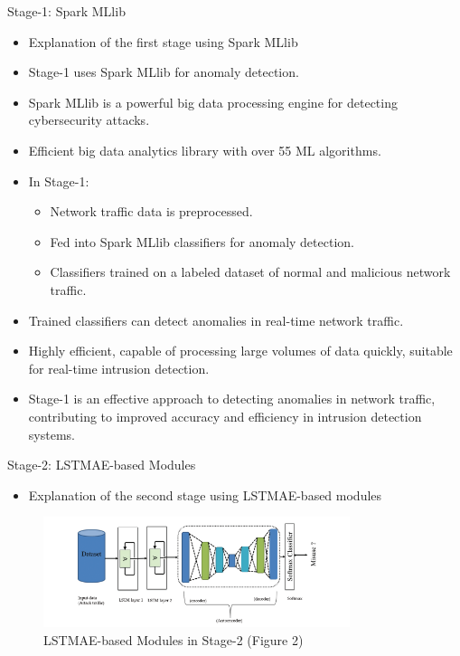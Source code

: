 \documentclass{beamer}
\begin{document}
\begin{frame}{Stage-1: Spark MLlib}
  \begin{itemize}
    \item Explanation of the first stage using Spark MLlib
  \end{itemize}


  \begin{itemize}
    \item Stage-1 uses Spark MLlib for anomaly detection.
    \item Spark MLlib is a powerful big data processing engine for detecting cybersecurity attacks.
    \item Efficient big data analytics library with over 55 ML algorithms.
    \item In Stage-1:
      \begin{itemize}
        \item Network traffic data is preprocessed.
        \item Fed into Spark MLlib classifiers for anomaly detection.
        \item Classifiers trained on a labeled dataset of normal and malicious network traffic.
      \end{itemize}
    \item Trained classifiers can detect anomalies in real-time network traffic.
    \item Highly efficient, capable of processing large volumes of data quickly, suitable for real-time intrusion detection.
    \item Stage-1 is an effective approach to detecting anomalies in network traffic, contributing to improved accuracy and efficiency in intrusion detection systems.
  \end{itemize}
\end{frame}


\begin{frame}{Stage-2: LSTMAE-based Modules }
  \begin{itemize}
    \item Explanation of the second stage using LSTMAE-based modules
  \end{itemize}

  \begin{figure}
    \centering
    \includegraphics[width=0.8\textwidth]{Figure 2.PNG}
    \caption{LSTMAE-based Modules in Stage-2 (Figure 2)}
  \end{figure}

\end{frame}
\end{document}
